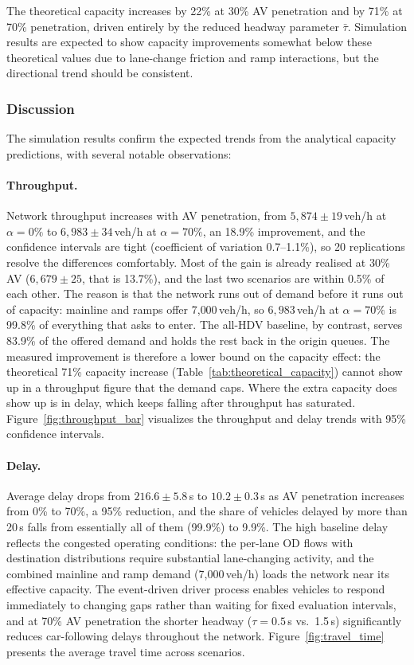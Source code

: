 \documentclass[review,authoryear]{elsarticle}
\begin{document}
The theoretical capacity increases by 22\% at 30\% AV penetration and by 71\% at 70\% penetration, driven entirely by the reduced headway parameter $\bar{\tau}$. Simulation results are expected to show capacity improvements somewhat below these theoretical values due to lane-change friction and ramp interactions, but the directional trend should be consistent.

\subsubsection{Discussion}

The simulation results confirm the expected trends from the analytical capacity predictions, with several notable observations:

\paragraph{Throughput.} Network throughput increases with AV penetration, from $5{,}874 \pm 19$\,veh/h at $\alpha = 0\%$ to $6{,}983 \pm 34$\,veh/h at $\alpha = 70\%$, an 18.9\% improvement, and the confidence intervals are tight (coefficient of variation 0.7--1.1\%), so 20 replications resolve the differences comfortably. Most of the gain is already realised at 30\% AV ($6{,}679 \pm 25$, that is 13.7\%), and the last two scenarios are within 0.5\% of each other. The reason is that the network runs out of demand before it runs out of capacity: mainline and ramps offer 7{,}000\,veh/h, so $6{,}983$\,veh/h at $\alpha = 70\%$ is 99.8\% of everything that asks to enter. The all-HDV baseline, by contrast, serves 83.9\% of the offered demand and holds the rest back in the origin queues. The measured improvement is therefore a lower bound on the capacity effect: the theoretical 71\% capacity increase (Table~\ref{tab:theoretical_capacity}) cannot show up in a throughput figure that the demand caps. Where the extra capacity does show up is in delay, which keeps falling after throughput has saturated. Figure~\ref{fig:throughput_bar} visualizes the throughput and delay trends with 95\% confidence intervals.

\paragraph{Delay.} Average delay drops from $216.6 \pm 5.8$\,s to $10.2 \pm 0.3$\,s as AV penetration increases from 0\% to 70\%, a 95\% reduction, and the share of vehicles delayed by more than 20\,s falls from essentially all of them (99.9\%) to 9.9\%. The high baseline delay reflects the congested operating conditions: the per-lane OD flows with destination distributions require substantial lane-changing activity, and the combined mainline and ramp demand (7{,}000\,veh/h) loads the network near its effective capacity. The event-driven driver process enables vehicles to respond immediately to changing gaps rather than waiting for fixed evaluation intervals, and at 70\% AV penetration the shorter headway ($\tau = 0.5$\,s vs.\ 1.5\,s) significantly reduces car-following delays throughout the network. Figure~\ref{fig:travel_time} presents the average travel time across scenarios.
\end{document}
